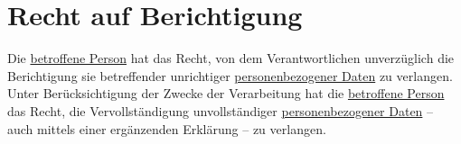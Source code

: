 \chapter{Recht auf Berichtigung}
\label{ch:16}


Die \hyperref[itm:04-1]{betroffene Person} hat das Recht, von dem Verantwortlichen unverzüglich die Berichtigung sie betreffender unrichtiger
\hyperref[itm:04-1]{personenbezogener Daten} zu verlangen. Unter Berücksichtigung der Zwecke der Verarbeitung hat die \hyperref[itm:04-1]{betroffene Person} das
Recht, die Vervollständigung unvollständiger \hyperref[itm:04-1]{personenbezogener Daten} -- auch mittels einer ergänzenden Erklärung -- zu
verlangen.


